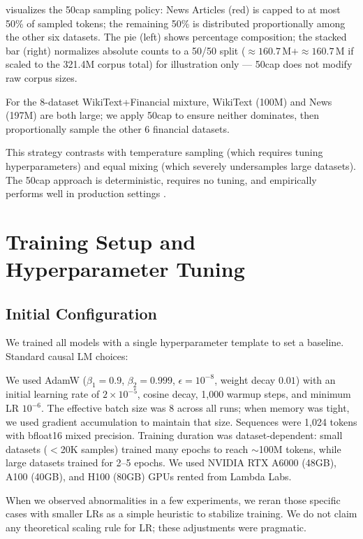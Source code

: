  visualizes the 50cap sampling policy: News Articles (red) is capped to at most 50\% of sampled tokens; the remaining 50\% is distributed proportionally among the other six datasets. The pie (left) shows percentage composition; the stacked bar (right) normalizes absolute counts to a 50/50 split (\(\approx\!160.7\,\text{M}+\approx\!160.7\,\text{M}\) if scaled to the 321.4M corpus total) for illustration only — 50cap does not modify raw corpus sizes.

For the 8-dataset WikiText+Financial mixture, WikiText (100M) and News (197M) are both large; we apply 50cap to ensure neither dominates, then proportionally sample the other 6 financial datasets.

This strategy contrasts with temperature sampling (which requires tuning hyperparameters) and equal mixing (which severely undersamples large datasets). The 50cap approach is deterministic, requires no tuning, and empirically performs well in production settings \parencite{longpre2023pretrainer}.

\section{Training Setup and Hyperparameter Tuning}

\subsection{Initial Configuration}

We trained all models with a single hyperparameter template to set a baseline. Standard causal LM choices:

We used AdamW ($\beta_1=0.9$, $\beta_2=0.999$, $\epsilon=10^{-8}$, weight decay $0.01$) with an initial learning rate of $2\times10^{-5}$, cosine decay, 1{,}000 warmup steps, and minimum LR $10^{-6}$. The effective batch size was 8 across all runs; when memory was tight, we used gradient accumulation to maintain that size. Sequences were 1{,}024 tokens with bfloat16 mixed precision. Training duration was dataset‑dependent: small datasets ($<$20K samples) trained many epochs to reach $\sim$100M tokens, while large datasets trained for 2–5 epochs. We used NVIDIA RTX A6000 (48GB), A100 (40GB), and H100 (80GB) GPUs rented from Lambda Labs.

When we observed abnormalities in a few experiments, we reran those specific cases with smaller LRs as a simple heuristic to stabilize training. We do not claim any theoretical scaling rule for LR; these adjustments were pragmatic.

